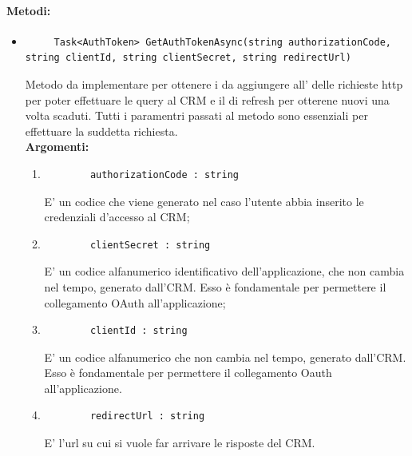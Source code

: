 \paragraph{Metodi:}\hfill
\begin{itemize}
	\itemsep0em 	
	\item 
	\begin{lstlisting}
	 Task<AuthToken> GetAuthTokenAsync(string authorizationCode, string clientId, string clientSecret, string redirectUrl)
	\end{lstlisting}
	Metodo da implementare per ottenere i  da aggiungere all' delle richieste http per poter effettuare le query al CRM e il  di refresh per otterene nuovi  una volta scaduti. Tutti i paramentri passati al metodo sono essenziali per effettuare la suddetta richiesta.\\
	\textbf{\small Argomenti:}
	\begin{enumerate}[leftmargin=*]
		\itemsep0em 
		\item 
		\begin{lstlisting}
		authorizationCode : string
		\end{lstlisting}
		E' un codice che viene generato nel caso l'utente abbia inserito le credenziali d'accesso al CRM;
		\item 
		\begin{lstlisting}
		clientSecret : string
		\end{lstlisting}
		E' un codice alfanumerico identificativo dell'applicazione, che non cambia nel tempo, generato dall'CRM. Esso è fondamentale per permettere il collegamento OAuth all'applicazione; 
		\item 
		\begin{lstlisting}
		clientId : string
		\end{lstlisting}
		E' un codice alfanumerico che non cambia nel tempo, generato dall'CRM. Esso è fondamentale per permettere il collegamento Oauth all'applicazione. 
		\item 
		\begin{lstlisting}
		redirectUrl : string
		\end{lstlisting}
		E' l'url su cui si vuole far arrivare le risposte del CRM.
	\end{enumerate}
	

\end{itemize}
